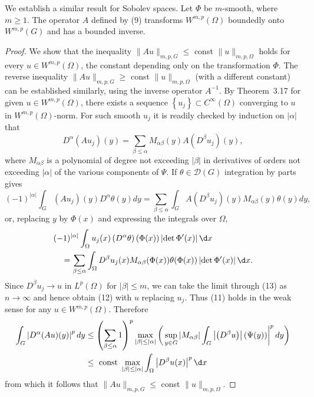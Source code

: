 \begin{theorem}
  We establish a similar result for Sobolev spaces.
  Let $\Phi$ be $m$-smooth, where $m \geq 1$. The operator $A$ defined by (9)
  transforms $W^{m,p}(\Omega)$ boundedly onto $W^{m,p}(G)$ and has a bounded inverse.
\end{theorem}

\begin{proof}
  We show that the inequality $\|A u\|_{m, p, G} \leq$ const $\|u\|_{m, p, \Omega}$ holds for 
  every $u \in W^{m,p}(\Omega)$, the constant depending only on the transformation $\Phi$.
  The reverse inequality $\|A u\|_{m, p, G} \geq$ const $\|u\|_{m, p, \Omega}$ (with a different 
  constant) can be established similarly, using the inverse operator $A^{-1}$.
  By Theorem~3.17 for given $u \in W^{m,p}(\Omega)$, there exists
  a sequence $\left\{u_j\right\} \subset C^{\infty}(\Omega)$ converging to $u$
  in $W^{m,p}(\Omega)$-norm.
  For such smooth $u_j$ it is readily checked by induction on $|\alpha|$ that
  \begin{equation}\label{eq:3.11}
    D^\alpha\left(A u_j\right)(y)=\sum_{\beta \leq \alpha} M_{\alpha \beta}(y) A\left(D^\beta u_j\right)(y),
  \end{equation}
  where $M_{\alpha \beta}$ is a polynomial of degree not exceeding $|\beta|$ in derivatives of 
  orders not exceeding $|\alpha|$ of the various components of $\Psi$.
  If $\theta \in \mathscr{D}(G)$ integration by parts gives
  \begin{equation}\label{eq:3.12}
    (-1)^{|\alpha|} \int_G\left(A u_j\right)(y) D^\alpha \theta(y) d y=\sum_{\beta \leq \alpha} \int_G A\left(D^\beta u_j\right)(y) M_{\alpha \beta}(y) \theta(y) d y,
  \end{equation}
  or, replacing $y$ by $\Phi(x)$ and expressing the integrals over $\Omega$,
  \begin{align}
  & (-1)^{|\alpha|} \int_{\Omega} u_j(x)\left(D^\alpha \theta\right)(\Phi(x))\left|\det \Phi^{\prime}(x)\right| \d x \notag \\
  & \quad=\sum_{\beta \leq \alpha} \int_{\Omega} D^\beta u_j(x) M_{\alpha \beta}(\Phi(x)) \theta(\Phi(x))\left|\det \Phi^{\prime}(x)\right| \d x . \label{eq:3.13}
  \end{align}
  Since $D^\beta u_j \rightarrow u$ in $L^p(\Omega)$ for $|\beta| \leq m$,
  we can take the limit through (13) as $n \rightarrow \infty$ and hence obtain (12) with $u$ 
  replacing $u_j$. Thus (11) holds in the weak sense for any $u \in W^{m,p}(\Omega)$. Therefore
  \[
  \begin{aligned}
  \int_G\left|D^\alpha(A u)(y)\right|^p d y & \leq\left(\sum_{\beta \leq \alpha} 1\right)^p \max _{|\beta| \leq|\alpha|}\left(\left.\sup _{y \in G}\left|M_{\alpha \beta}\right| \int_G\left|\left(D^\beta u\right)\right|(\Psi(y))\right|^p d y\right) \\
  & \leq \text { const } \max _{|\beta| \leq|\alpha|} \int_{\Omega}\left|D^\beta u(x)\right|^p \d x
  \end{aligned}
  \]
  from which it follows that $\|A u\|_{m, p, G} \leq$ const $\|u\|_{m, p, \Omega}$.
\end{proof}

